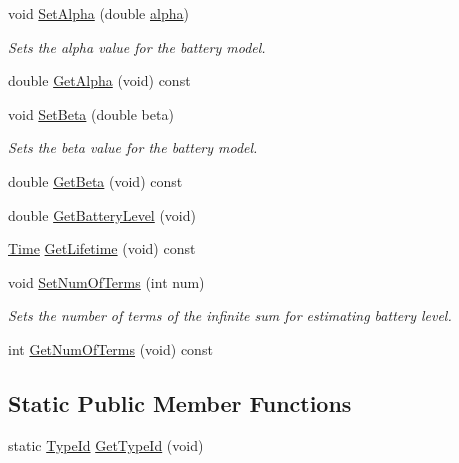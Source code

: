 \begin{DoxyCompactItemize}
\item 
void \hyperlink{classns3_1_1RvBatteryModel_ab7ed42697329357ed95a18cf2ec0d5d9}{Set\+Alpha} (double \hyperlink{lte__uplink__power__control_8m_a62197192f0fbf4e0675eb37be1c4c175}{alpha})
\begin{DoxyCompactList}\small\item\em Sets the alpha value for the battery model. \end{DoxyCompactList}\item 
double \hyperlink{classns3_1_1RvBatteryModel_a91cdabc79e3f2a6facfe95202fa77e34}{Get\+Alpha} (void) const 
\item 
void \hyperlink{classns3_1_1RvBatteryModel_a82f89a01a1f487d3a71e9e21e5322286}{Set\+Beta} (double beta)
\begin{DoxyCompactList}\small\item\em Sets the beta value for the battery model. \end{DoxyCompactList}\item 
double \hyperlink{classns3_1_1RvBatteryModel_ad787cf29a82eea91384fe43146f64d28}{Get\+Beta} (void) const 
\item 
double \hyperlink{classns3_1_1RvBatteryModel_af3047a4edc01822b612bb2fb70ee7991}{Get\+Battery\+Level} (void)
\item 
\hyperlink{classns3_1_1Time}{Time} \hyperlink{classns3_1_1RvBatteryModel_a0195713aa6eeb966f3189192b5fbeea1}{Get\+Lifetime} (void) const 
\item 
void \hyperlink{classns3_1_1RvBatteryModel_a23db3b707a4885248157b96db2ad600d}{Set\+Num\+Of\+Terms} (int num)
\begin{DoxyCompactList}\small\item\em Sets the number of terms of the infinite sum for estimating battery level. \end{DoxyCompactList}\item 
int \hyperlink{classns3_1_1RvBatteryModel_ac019bceefdd171250deedee5b24d90af}{Get\+Num\+Of\+Terms} (void) const 
\end{DoxyCompactItemize}
\subsection*{Static Public Member Functions}
\begin{DoxyCompactItemize}
\item 
static \hyperlink{classns3_1_1TypeId}{Type\+Id} \hyperlink{classns3_1_1RvBatteryModel_a427636046ac8a08ffe769cfe27239da2}{Get\+Type\+Id} (void)
\end{DoxyCompactItemize}
